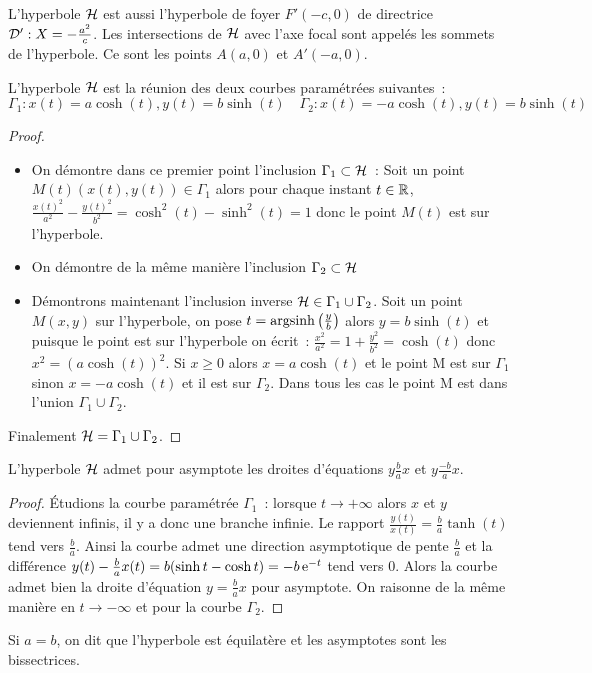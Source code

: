 L'hyperbole \(\mathcal{H}\) est aussi l'hyperbole de foyer \(F'(-c, 0)\) de directrice
\(\mathcal{D} ':X = -\frac{a^2}{c}\). Les intersections de \(\mathcal{H}\) avec l'axe focal sont
appelés les sommets de l'hyperbole. Ce sont les points \(A(a, 0)\) et
\(A'(-a, 0)\).
\begin{prop}
  L'hyperbole \(\mathcal{H}\) est la réunion des deux courbes paramétrées suivantes~:
  \begin{equation}
    \Gamma_1 : x(t) = a\cosh(t), y(t) = b\sinh(t) \quad \Gamma_2 : x(t) = -a\cosh(t),
    y(t) = b\sinh(t)
  \end{equation}
\end{prop}
\begin{proof}
  \begin{itemize}
    \item On démontre dans ce premier point l'inclusion \(\Gamma_1 \subset
      \mathcal{H}\)~: Soit un point \(M(t)(x(t),y(t)) \in \Gamma_1\) alors pour chaque
      instant \(t \in \mathbb{R}\),
      \(\frac{x(t)^2}{a^2}-\frac{y(t)^2}{b^2} = \cosh^2(t)-\sinh^2(t) = 1\) donc le
      point \(M(t)\) est sur l'hyperbole.
    \item On démontre de la même manière l'inclusion  \(\Gamma_2 \subset \mathcal{H}\)
    \item Démontrons maintenant l'inclusion inverse \(\mathcal{H} \in
      \Gamma_1\cup\Gamma_2\). Soit un point \(M(x, y)\) sur l'hyperbole, on pose
      \(t = \operatorname{argsinh}\left(\frac{y}{b}\right)\) alors \(y = b\sinh(t)\) et puisque le
      point est sur l'hyperbole on écrit~:
      \(\frac{x^2}{a^2} = 1 + \frac{y^2}{b^2} = \cosh(t)\) donc \(x^2 = (a\cosh(t))^2\).
      Si \(x\geqslant 0\) alors \(x = a\cosh(t)\) et le point M est sur
      \(\Gamma_1\) sinon \(x = -a\cosh(t)\) et il est sur \(\Gamma_2\). Dans tous
      les cas le point M est dans l'union \(\Gamma_1 \cup \Gamma_2\).
  \end{itemize}
  Finalement \(\mathcal{H} = \Gamma_1 \cup \Gamma_2\).
\end{proof}
\begin{prop}
  L'hyperbole \(\mathcal{H}\) admet pour asymptote les droites d'équations
  \(y\frac{b}{a}x\) et \(y\frac{-b}{a}x\).
\end{prop}
\begin{proof}
  Étudions la courbe paramétrée \(\Gamma_1\)~: lorsque \(t \to +\infty\) alors
  \(x\) et \(y\) deviennent infinis, il y a donc une branche infinie. Le rapport
  \(\frac{y(t)}{x(t)} = \frac{b}{a} \tanh(t)\) tend vers \(\frac{b}{a}\). Ainsi la
  courbe admet une direction asymptotique de pente \(\frac{b}{a}\) et la
  différence \(y(t) -\frac{b}{a}x(t) = b(\sinh t -\cosh t) = -b\operatorname{e}^{-t}\) tend vers
  0. Alors la courbe admet bien la droite d'équation \(y = \frac{b}{a}x\) pour
  asymptote. On raisonne de la même manière en \(t\to -\infty\) et pour la
  courbe \(\Gamma_2\).
\end{proof}
Si \(a = b\), on dit que l'hyperbole est équilatère et les asymptotes sont les
bissectrices.



